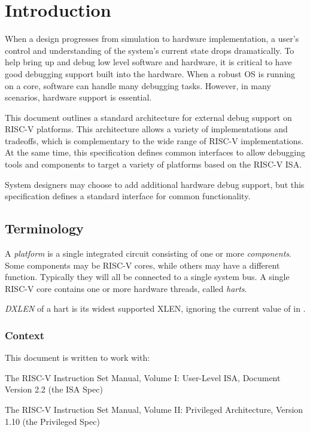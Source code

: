 \chapter{Introduction}
\label{sec:intro}

When a design progresses from simulation to hardware implementation, a user's
control and understanding of the system's current state drops dramatically.
To help bring up and debug low level software and hardware,
it is critical to have good debugging support built into the hardware.
When a robust OS is running on a core, software can handle many
debugging tasks. However, in many scenarios, hardware support is essential.

This document outlines a standard architecture for external debug support
on RISC-V platforms. This architecture allows a variety of implementations and
tradeoffs, which is complementary to the wide range of RISC-V implementations.
At the same time, this specification defines common interfaces to
allow debugging tools and components to target a variety of platforms based on the RISC-V ISA.

System designers may choose to add additional hardware debug support,
but this specification defines a standard interface for common
functionality.

\section{Terminology}

A \emph{platform} is a single integrated circuit consisting of one or more
\emph{components}. Some components may be RISC-V cores, while others may have a different
function. Typically they will all be connected to a single system bus.
A single RISC-V core contains one or more hardware threads, called
\emph{harts}.

\emph{DXLEN} of a hart is its widest supported XLEN, ignoring the current value
of \Fmxl in \Rmisa.

\subsection{Context}

\begin{steps}{This document is written to work with:}
\item The RISC-V Instruction Set Manual, Volume I: User-Level ISA, Document
    Version 2.2 (the ISA Spec)
\item The RISC-V Instruction Set Manual, Volume II: Privileged Architecture,
    Version 1.10 (the Privileged Spec)
\end{steps}

